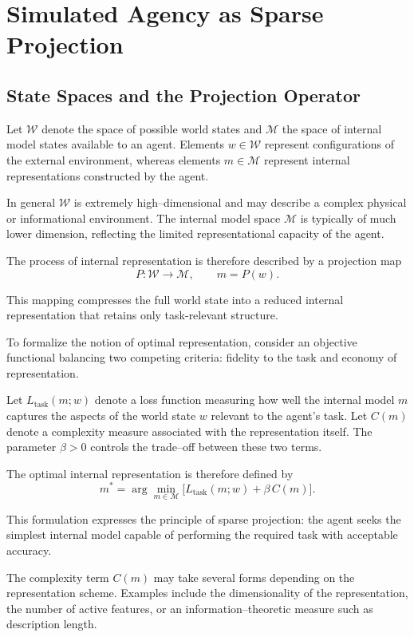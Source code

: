 \documentclass[11pt, openany]{book}
\theoremstyle{plain}
\theoremstyle{definition}
\theoremstyle{remark}
\begin{document}
\chapter{Simulated Agency as Sparse Projection}

\section{State Spaces and the Projection Operator}

Let $\mathcal{W}$ denote the space of possible world states and
$\mathcal{M}$ the space of internal model states available to an agent.
Elements $w\in\mathcal{W}$ represent configurations of the external
environment, whereas elements $m\in\mathcal{M}$ represent internal
representations constructed by the agent.

In general $\mathcal{W}$ is extremely high–dimensional and may describe
a complex physical or informational environment.  The internal model
space $\mathcal{M}$ is typically of much lower dimension, reflecting the
limited representational capacity of the agent.

The process of internal representation is therefore described by a
projection map
\[
P:\mathcal{W}\to\mathcal{M},
\qquad
m=P(w).
\]

This mapping compresses the full world state into a reduced internal
representation that retains only task-relevant structure.

\medskip

To formalize the notion of optimal representation, consider an objective
functional balancing two competing criteria: fidelity to the task and
economy of representation.

Let $L_{\text{task}}(m;w)$ denote a loss function measuring how well the
internal model $m$ captures the aspects of the world state $w$ relevant
to the agent's task.  Let $C(m)$ denote a complexity measure associated
with the representation itself.  The parameter $\beta>0$ controls the
trade–off between these two terms.

The optimal internal representation is therefore defined by
\[
m^*
=
\arg\min_{m\in\mathcal{M}}
\bigl[
L_{\text{task}}(m;w)
+
\beta\,C(m)
\bigr].
\]

This formulation expresses the principle of sparse projection: the agent
seeks the simplest internal model capable of performing the required
task with acceptable accuracy.

\medskip

The complexity term $C(m)$ may take several forms depending on the
representation scheme.  Examples include the dimensionality of the
representation, the number of active features, or an information–theoretic
measure such as description length.
\end{document}
